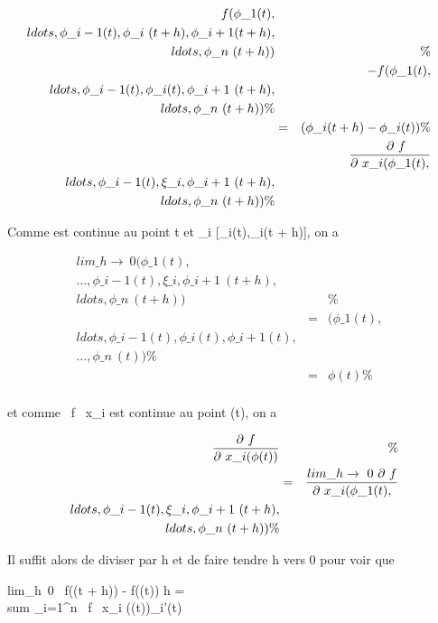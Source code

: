 \documentclass[]{article}
\begin{document}
\begin{align*}
f(\phi\_1(t),\\ldots,\phi\_i-1(t),\phi\_i~(t
+ h),\phi\_i+1(t +
h),\\ldots,\phi\_n~(t
+ h))&& \%& \\ & &
-f(\phi\_1(t),\\ldots,\phi\_i-1(t),\phi\_i(t),\phi\_i+1~(t
+
h),\\ldots,\phi\_n~(t
+ h))\%& \\ & =& (\phi\_i(t + h) -
\phi\_i(t)) \%& \\ & &
\quad  \partial~f \over \partial~x\_i
(\phi\_1(t),\\ldots,\phi\_i-1(t),\xi\_i,\phi\_i+1~(t
+
h),\\ldots,\phi\_n~(t
+ h)) \%& \\
\end{align*}

Comme \phi est continue au point t et \xi\_i \in
{[}\phi\_i(t),\phi\_i(t + h){]}, on a

\begin{align*}
lim\_h\rightarrow~0(\phi\_1(t),\\\ldots,\phi\_i-1(t),\xi\_i,\phi\_i+1~(t
+
h),\\ldots,\phi\_n~(t
+ h))&&\%& \\ & =&
(\phi\_1(t),\\ldots,\phi\_i-1(t),\phi\_i(t),\phi\_i+1(t),\\\ldots,\phi\_n~(t))\%&
\\ & =& \phi(t) \%&
\\ \end{align*}

et comme  \partial~f \over \partial~x\_i est continue au
point \phi(t), on a

\begin{align*} \partial~f \over
\partial~x\_i (\phi(t))&& \%& \\ & =&
lim\_h\rightarrow~0~ \partial~f \over
\partial~x\_i
(\phi\_1(t),\\ldots,\phi\_i-1(t),\xi\_i,\phi\_i+1~(t
+
h),\\ldots,\phi\_n~(t
+ h))\%& \\
\end{align*}

Il suffit alors de diviser par h et de faire tendre h vers 0 pour voir
que

lim\_h\rightarrow~0~ f(\phi(t + h)) - f(\phi(t))
\over h = \\sum
\_i=1^n \partial~f \over \partial~x\_i
(\phi(t))\phi\_i'(t)
\end{document}
